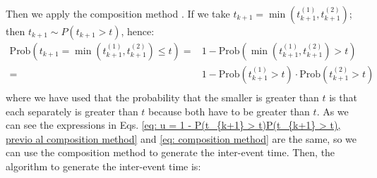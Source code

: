 Then we apply the composition method \cite{dassios2013exact}. If we take $t_{k+1}=\min\left( t_{k+1}^{(1)},t_{k+1}^{(2)} \right)$; then $t_{k+1}\sim P(t_{k+1}>t)$, hence:
\begin{equation}
    \begin{split}
        \text{Prob}(t_{k+1}=\min\left(  t_{k+1}^{(1)},t_{k+1}^{(2)} \right)\leq t)=&1-\text{Prob}\left( \min \left( t_{k+1}^{(1)},t_{k+1}^{(2)}\right)>t \right)\\
        =&1-\text{Prob}\left( t_{k+1}^{(1)}>t \right)\cdot\text{Prob}\left( t_{k+1}^{(2)}>t \right)\\
    \end{split}
    \label{eq: composition method}
\end{equation}
where we have used that the probability that the smaller is greater than $t$ is that each separately is greater than $t$ because both have to be greater than $t$. As we can 
see the expressions in Eqs. \ref{eq: u = 1 - P(t_{k+1} > t)P(t_{k+1} > t), previo al composition method} and \ref{eq: composition method} are the same, so we can use the composition 
method to generate the inter-event time. Then, the algorithm to generate the inter-event time is:
